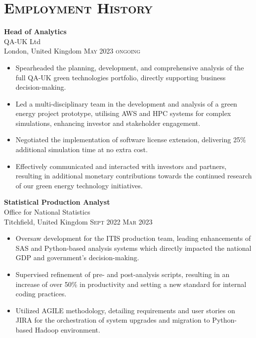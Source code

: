 \documentclass[oneside]{article}
\newcommand{\empitem}[7]{
        {\large \textbf{#1}} \\
        {{\fontseries{medium}\selectfont #2}}\\
        {{\fontseries{light}\selectfont #3}} \hfill
        {\scshape\fontseries{light}\selectfont\footnotesize #4 \textendash{} #5 #6} 
        #7
}
\begin{document}
{\begin{minipage}[t][\dimexpr\textheight-2\fboxrule-2\fboxsep\relax][t]{\dimexpr0.6\textwidth-2\fboxrule-2\fboxsep\relax}
        \section*{\scshape\Large Employment History \hrulefill}
%
        \empitem{Head of Analytics}
        {QA-UK Ltd}
        {London, United Kingdom}
        {May 2023}
        {ongoing}
        {}
        {
        \begin{itemize}
            \setlength{\itemsep}{-3pt}
            \item Spearheaded the planning, development, and comprehensive analysis of the full QA-UK green technologies portfolio, directly supporting business decision-making.
            \item Led a multi-disciplinary team in the development and analysis of a green energy project prototype, utilising AWS and HPC systems for complex simulations, enhancing investor and stakeholder engagement.
            \item Negotiated the implementation of software license extension, delivering 25\% additional simulation time at no extra cost.
            \item Effectively communicated and interacted with investors and partners, resulting in additional monetary contributions towards the continued research of our green energy technology initiatives. 
        \end{itemize}
        }
%
        \empitem {Statistical Production Analyst}
        {Office for National Statistics}
        {Titchfield, United Kingdom}
        {Sept 2022}
        {Mar 2023}
        {}
        {
        \begin{itemize}
            \setlength{\itemsep}{-3pt}
            \item Oversaw development for the  ITIS production team, leading enhancements of SAS and Python-based analysis systems which directly impacted the national GDP and government's decision-making.
            \item Supervised refinement of pre- and post-analysis scripts, resulting in an increase of over 50\% in productivity and setting a new standard for internal coding practices.
            \item Utilized AGILE methodology, detailing requirements and user stories on JIRA for the orchestration of system upgrades and migration to Python-based Hadoop environment.

\end{itemize}}
\end{minipage}}
\end{document}
